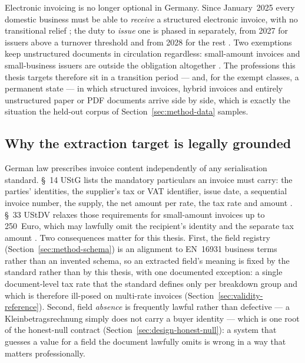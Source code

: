 Electronic invoicing is no longer optional in Germany. Since January~2025 every domestic
business must be able to \emph{receive} a structured electronic invoice, with no
transitional relief \parencite{ustg14}; the duty to \emph{issue} one is phased in
separately, from 2027 for issuers above a turnover threshold and from 2028 for the rest
\parencite{ustg27,bstbkerechnung}. Two exemptions keep unstructured documents in
circulation regardless: small-amount invoices and small-business issuers are outside the
obligation altogether \parencite{bstbkerechnung}. The professions this thesis targets
therefore sit in a transition period --- and, for the exempt classes, a permanent state ---
in which structured invoices, hybrid invoices and entirely unstructured paper or
\ac{PDF} documents arrive side by side, which is exactly the situation the
held-out corpus of Section~\ref{sec:method-data} samples.

\subsection{Why the extraction target is legally grounded}
\label{sec:bg-legal-target}

German law prescribes invoice content independently of any serialisation standard.
\S~14 \ac{UStG} lists the mandatory particulars an invoice must carry: the parties'
identities, the supplier's tax or \ac{VAT} identifier, issue date, a sequential invoice
number, the supply, the net amount per rate, the tax rate and amount \parencite{ustg14}.
\S~33 \ac{UStDV} relaxes those requirements for small-amount invoices up to
250~Euro, which may lawfully omit the recipient's identity and the separate tax amount
\parencite{ustdv33}. Two consequences matter for this thesis. First, the field registry
(Section~\ref{sec:method-schema}) is an alignment to \ac{EN}~16931 business terms rather than
an invented schema, so an extracted field's meaning is fixed by the standard rather than by
this thesis, with one documented exception: a single document-level tax rate that the
standard defines only per breakdown group and which is therefore ill-posed on multi-rate
invoices (Section~\ref{sec:validity-reference}). Second, field
\emph{absence} is frequently lawful rather than defective --- a Kleinbetragsrechnung
simply does not carry a buyer identity --- which is one root of the honest-null contract
(Section~\ref{sec:design-honest-null}): a system that guesses a value for a field the document
lawfully omits is wrong in a way that matters professionally.

